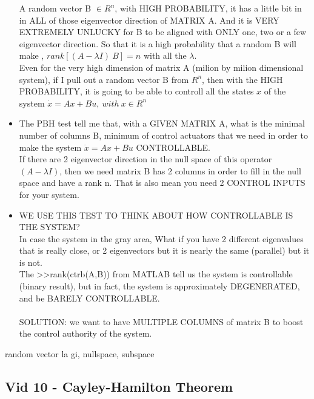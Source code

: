 \documentclass{article}
\begin{document}
\begin{itemize}
				A random vector B $\in R^n$, with HIGH PROBABILITY, it has a little bit in in ALL of those eigenvector direction of MATRIX A.
				And it is VERY EXTREMELY UNLUCKY for B to be aligned with ONLY one, two or a few eigenvector direction.
				So that it is a high probability that a random B will make , $rank[(A - \lambda I) ~B] = n $
				with all the $\lambda$.\\
				
				Even for the very high dimension of matrix A (milion by milion dimensional system),
				if I pull out a random vector B from $R^n$, then with the HIGH PROBABILITY, it is going to be able
				to controll all the states $x$ of the system $\dot{x} = Ax + Bu, ~with~ x\in R^n$

		\item The PBH test tell me that, with a GIVEN MATRIX A, what is the minimal number of columns B, 
				minimum of control actuators that we need in order to make the system $\dot{x} = Ax + Bu$ CONTROLLABLE.\\
		
				If there are 2 eigenvector direction in the null space of this operator $(A - \lambda I)$, 
				then we need matrix B has 2 columns in order to fill in the null space and have a rank n. 
				That is also mean you need 2 CONTROL INPUTS for your system.

		\item WE USE THIS TEST TO THINK ABOUT HOW CONTROLLABLE IS THE SYSTEM?\\
				In case the system in the gray area, What if you have 2 different eigenvalues that is really close,
				or 2 eigenvectors but it is nearly the same (parallel) but it is not.\\
				The >>rank(ctrb(A,B)) from MATLAB tell us the system is controllable (binary result), but in fact,
				the system is approximately DEGENERATED, and be BARELY CONTROLLABLE.\\
				\\SOLUTION: we want to have MULTIPLE COLUMNS of matrix B to boost the control authority of the system.
		\end{itemize}




random vector la gi, nullspace, subspace


\subsection{Vid 10 - Cayley-Hamilton Theorem}
\end{document}
